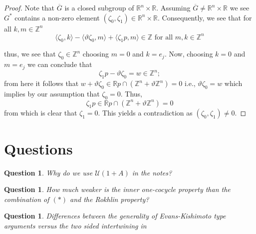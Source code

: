 \documentclass[11pt,a4paper,oneside]{amsart}
\newtheorem{question}[theorem]{Question}
\begin{document}
\begin{proof}
Note that $\overline G$ is a closed subgroup of $\mathbb R^n\times \mathbb R$. Assuming $\overline{G}\neq \mathbb{R}^n\times \mathbb{R}$ we see $G^*$ contains a non-zero element $(\zeta_0, \zeta_1)\in \mathbb{R}^n\times \mathbb{R}$. Consequently, we see that for all $k,m\in \mathbb{Z}^n$ \[\langle \zeta_0,k \rangle-\langle \vartheta\zeta_0,  m\rangle+ \langle \zeta_1p, m\rangle \in \mathbb{Z} \text{ for all } m,k\in \mathbb{Z}^n\]

thus, we see that $\zeta_0\in \mathbb{Z}^n$ choosing $m=0$ and $k=e_j$. Now, choosing $k=0$ and $m=e_j$ we can conclude that \[\zeta_1p-\vartheta\zeta_0=w\in \mathbb{Z}^n;\] from here it follows that $w+\vartheta \zeta_0\in \mathbb{R}p\cap (\mathbb{Z}^n+ \vartheta \mathbb{Z}^n)=0$ i.e., $\vartheta \zeta_0=w$ which implies by our assumption that $\zeta_0=0$. Thus, $$\zeta_1 p\in \mathbb{R}p\cap (\mathbb{Z}^n+ \vartheta \mathbb{Z}^n)=0$$ from which is clear that $\zeta_1=0$. This yields a contradiction as $(\zeta_0, \zeta_1)\neq 0$.
\end{proof}

\section{Questions}
\begin{question}
Why do we use $\mathcal U(1+A)$ in the notes?
\end{question}

\begin{question}{How much weaker is the inner one-cocycle property than the combination of $(*)$ and the Rokhlin property?}
\end{question}

\begin{question}
Differences between the generality of Evans-Kishimoto type arguments versus the two sided intertwining in \cite{szabo2021categorical}
\end{question}


\printbibliography
\end{document}
